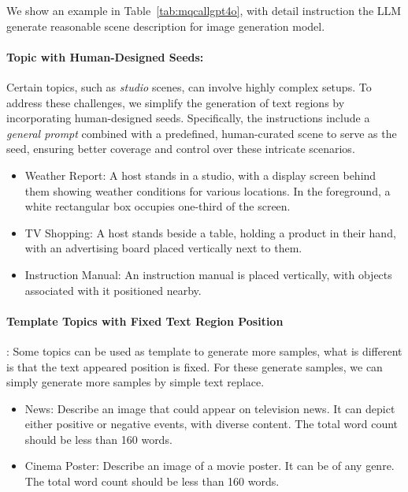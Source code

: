 We show an example in Table~\ref{tab:mqcallgpt4o}, with detail instruction the LLM generate reasonable scene description for image generation model.





\paragraph{Topic with Human-Designed Seeds:}
Certain topics, such as \textit{studio} scenes, can involve highly complex setups. 
To address these challenges, we simplify the generation of text regions by incorporating human-designed seeds. 
Specifically, the instructions include a \textit{general prompt} combined with a predefined, human-curated scene to serve as the seed, ensuring better coverage and control over these intricate scenarios.

\begin{itemize}
    \item Weather Report: A host stands in a studio, with a display screen behind them showing weather conditions for various locations. In the foreground, a white rectangular box occupies one-third of the screen.
    \item TV Shopping: A host stands beside a table, holding a product in their hand, with an advertising board placed vertically next to them.
    \item Instruction Manual: An instruction manual is placed vertically, with objects associated with it positioned nearby.
\end{itemize}


\paragraph{Template Topics with Fixed Text Region Position}:
Some topics can be used as template to generate more samples, what is different is that the text appeared position is fixed.
For these generate samples, we can simply generate more samples by simple text replace.

\begin{itemize}
    \item News: Describe an image that could appear on television news. It can depict either positive or negative events, with diverse content. The total word count should be less than 160 words.
    \item Cinema Poster: Describe an image of a movie poster. It can be of any genre. The total word count should be less than 160 words.
\end{itemize}



